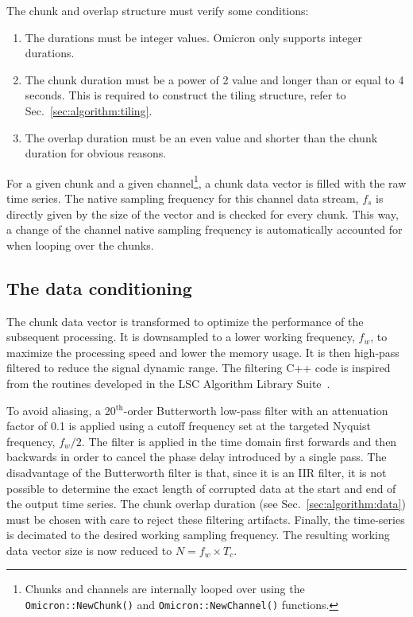 The chunk and overlap structure must verify some conditions:
\begin{enumerate}
\item The durations must be integer values. Omicron only supports integer durations.
\item The chunk duration must be a power of 2 value and longer than or equal to 4 seconds. This is required to construct the tiling structure, refer to Sec.~\ref{sec:algorithm:tiling}.
\item The overlap duration must be an even value and shorter than the chunk duration for obvious reasons.
\end{enumerate}

For a given chunk and a given channel\footnote{Chunks and channels are internally looped over using the \texttt{Omicron::NewChunk()} and \texttt{Omicron::NewChannel()} functions.}, a chunk data vector is filled with the raw time series. The native sampling frequency for this channel data stream, $f_s$ is directly given by the size of the vector and is checked for every chunk.  This way, a change of the channel native sampling frequency is automatically accounted for when looping over the chunks.


\subsection{The data conditioning} \label{sec:algorithm:conditioning}
The chunk data vector is transformed to optimize the performance of the subsequent processing. It is downsampled to a lower working frequency, $f_w$, to maximize the processing speed and lower the memory usage. It is then high-pass filtered to reduce the signal dynamic range. The filtering C++ code is inspired from the routines developed in the LSC Algorithm Library Suite~\cite{LALSUITE}.

To avoid aliasing, a 20$^{\mathrm{th}}$-order Butterworth low-pass filter with an attenuation factor of 0.1 is applied using a cutoff frequency set at the targeted Nyquist frequency, $f_w/2$. The filter is applied in the time domain first forwards and then backwards in order to cancel the phase delay introduced by a single pass. The disadvantage of the Butterworth filter is that, since it is an IIR filter, it is not possible to determine the exact length of corrupted data at the start and end of the output time series. The chunk overlap duration (see Sec.~\ref{sec:algorithm:data}) must be chosen with care to reject these filtering artifacts. Finally, the time-series is decimated to the desired working sampling frequency. The resulting working data vector size is now reduced to $N=f_w \times T_c$.


